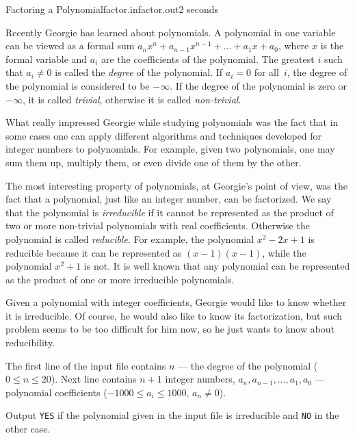 \begin{problem}{Factoring a Polynomial}{factor.in}{factor.out}{2 seconds}

Recently Georgie has learned about polynomials. A polynomial in one variable
can be viewed as a formal sum 
$a_nx^n+a_{n-1}x^{n-1}+\ldots + a_1x+a_0$,
where $x$ is the formal variable and $a_i$ are the coefficients of the polynomial. 
The greatest $i$ such that $a_i \ne 0$ is called the
\emph{degree} of the polynomial. If $a_i = 0$ for all~$i$, the degree of the
polynomial is considered to be $-\infty$.
If the degree of the polynomial is zero or $-\infty$, it is called 
\emph{trivial}, otherwise it is called \emph{non-trivial}.

What really impressed Georgie while studying polynomials 
was the fact that in some cases one can 
apply  different algorithms and techniques developed for 
integer numbers to polynomials.
For example, given two polynomials, one may sum them up, multiply them, or
even divide one of them by the other. 

The most interesting property of polynomials, at Georgie's point of view, was
the fact that a polynomial, just like an integer number, can be factorized.
We say that the polynomial is \emph{irreducible} if it cannot be represented
as the product of two or more non-trivial polynomials with real coefficients.
Otherwise the polynomial is called \emph{reducible}. 
For example, the polynomial $x^2-2x+1$
is reducible because it can be represented as $(x - 1) (x - 1)$,
while the polynomial $x^2+1$ is not. It is well known
that any polynomial can be represented as the product of one or more irreducible 
polynomials.

Given a polynomial with integer coefficients,
Georgie would like to know whether it is irreducible. Of course, he would also
like to know its factorization, but such problem seems to be too difficult for him
now, so he just wants to know about reducibility.

\InputFile

The first line of the input file contains $n$ --- the degree of the polynomial
($0 \le n \le 20$). Next line contains $n + 1$ integer numbers, 
$a_n, a_{n-1}, \ldots, a_1, a_0$ --- polynomial coefficients ($-1000 \le a_i \le 1000$,
$a_n \ne 0$).

\OutputFile

Output \texttt{YES} if the polynomial given in the input file is irreducible 
and \texttt{NO} in the other case.

\Example

\begin{example}[*]
%
%
\end{example}

\end{problem}
